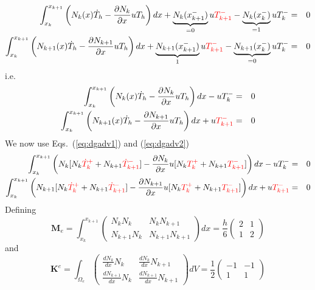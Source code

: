 \begin{eqnarray}
\int_{x_k}^{x_{k+1}}\left(
N_k(x) \dot{T}_h -
\frac{\partial N_k}{\partial x} uT_h \right) dx
+\underbrace{N_k(x_{k+1}^-)}_{=0}u {\color{red}T_{k+1}^-}     - \underbrace{N_k (x_{k}^-)}_{=1}uT_{k}^- &=& 0 \\
\int_{x_k}^{x_{k+1}}\left(
N_{k+1}(x) \dot{T}_h -
\frac{\partial N_{k+1}}{\partial x} uT_h \right) dx
+ \underbrace{N_{k+1}(x_{k+1}^-)}_{1}u {\color{red}T_{k+1}^-}     -\underbrace{N_{k+1}(x_{k}^-)}_{=0}uT_{k}^- &=& 0
\end{eqnarray}
i.e.
\begin{eqnarray}
\int_{x_k}^{x_{k+1}}\left(
N_k(x) \dot{T}_h -
\frac{\partial N_k}{\partial x} uT_h \right) dx
   -  uT_{k}^- &=& 0 \\
\int_{x_k}^{x_{k+1}}\left(
N_{k+1}(x)  \dot{T}_h -
\frac{\partial N_{k+1}}{\partial x} uT_h \right) dx
+ u{\color{red} T_{k+1}^-}      &=& 0
\end{eqnarray}
We now use Eqs.~(\ref{eq:dgadv1}) and (\ref{eq:dgadv2})
\begin{eqnarray}
\int_{x_k}^{x_{k+1}}\left(
N_k
[N_k {\color{red}\dot{T}_k^+} + N_{k+1} {\color{red}\dot{T}_{k+1}^-}]
-
\frac{\partial N_k}{\partial x} u
[N_k {\color{red}T_k^+} + N_{k+1} {\color{red}T_{k+1}^-}]
 \right) dx
   -  uT_{k}^- &=& 0 \\
\int_{x_k}^{x_{k+1}}\left(
N_{k+1} 
[N_k {\color{red}\dot{T}_k^+} + N_{k+1} {\color{red}\dot{T}_{k+1}^-}]
 -
\frac{\partial N_{k+1}}{\partial x} u
[N_k {\color{red}T_k^+} + N_{k+1} {\color{red}T_{k+1}^-}]
\right) dx
+ u{\color{red} T_{k+1}^-}      &=& 0
\end{eqnarray}
Defining
\[
{\bm M}_e=
\int_{x_k}^{x_{k+1}}
\left(
\begin{array}{cc}
N_kN_k & N_k N_{k+1} \\
N_{k+1}N_k & N_{k+1} N_{k+1} 
\end{array}
\right)
dx
= 
\frac{h}{6}
\left(
\begin{array}{cc}
2  & 1 \\
1 & 2
\end{array}
\right)
\]
and 
\[
{\bm K}^e =
\int_{\Omega_e} 
\left(
\begin{array}{cc}
\frac{dN_k}{dx} N_k     & \frac{dN_k}{dx} N_{k+1} \\
\frac{dN_{k+1}}{dx} N_k & \frac{dN_{k+1}}{dx} N_{k+1}
\end{array}
\right)
dV
=
\frac{1}{2}
\left(
\begin{array}{cc}
-1  & -1 \\
1 & 1
\end{array}
\right)
\]
